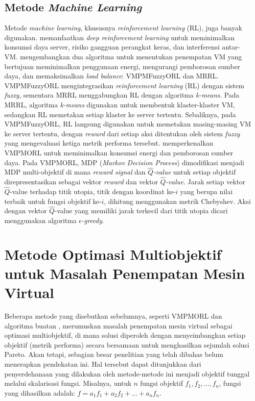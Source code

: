 \subsection{Metode \textit{Machine Learning}}
Metode \textit{machine learning}, khususnya \textit{reinforcement learning} (RL), juga banyak digunakan. \citet{Caviglione2021} memanfaatkan \textit{deep reinforcement learning} untuk meminimalkan konsumsi daya server, risiko gangguan perangkat keras, dan interferensi antar-VM. \citet{GhasemiHaghighatKeshavarzi2024} mengembangkan dua algoritma untuk menentukan penempatan VM yang bertujuan meminimalkan penggunaan energi, mengurangi pemborosan sumber daya, dan memaksimalkan \textit{load balance}: VMPMFuzzyORL dan MRRL. VMPMFuzzyORL mengintegrasikan \textit{reinforcement learning} (RL) dengan sistem \textit{fuzzy}, sementara MRRL menggabungkan RL dengan algoritma \textit{k-means}. Pada MRRL, algoritma \textit{k-means} digunakan untuk membentuk klaster-klaster VM, sedangkan RL memetakan setiap klaster ke server tertentu. Sebaliknya, pada VMPMFuzzyORL, RL langsung digunakan untuk memetakan masing-masing VM ke server tertentu, dengan \textit{reward} dari setiap aksi ditentukan oleh sistem \textit{fuzzy} yang mengevaluasi ketiga metrik performa tersebut. \citet{Qin2020} memperkenalkan VMPMORL untuk meminimalkan konsumsi energi dan pemborosan sumber daya. Pada VMPMORL, MDP (\textit{Markov Decision Process}) dimodifikasi menjadi MDP multi-objektif di mana \textit{reward signal} dan \textit{$\widehat{Q}$-value} untuk setiap objektif direpresentasikan sebagai vektor \textit{reward} dan vektor \textit{$\widehat{Q}$-value}. Jarak setiap vektor $\widehat{Q}$-value terhadap titik utopia, titik dengan koordinat ke-$i$ yang berupa nilai terbaik untuk fungsi objektif ke-$i$, dihitung menggunakan metrik Chebyshev. Aksi dengan vektor $\widehat{Q}$-value yang memiliki jarak terkecil dari titik utopia dicari menggunakan algoritma $\epsilon$-\textit{greedy}. 

\section{Metode Optimasi Multiobjektif untuk Masalah Penempatan Mesin Virtual}
Beberapa metode yang disebutkan sebelumnya, seperti VMPMORL \cite{Qin2020} dan algoritma buatan \citep{Caviglione2021}, merumuskan masalah penempatan mesin virtual sebagai optimasi multiobjektif, di mana solusi diperoleh dengan menyeimbangkan setiap objektif (metrik performa) secara bersamaan untuk menghasilkan sejumlah solusi Pareto. Akan tetapi, sebagian besar penelitian yang telah dibahas belum menerapkan pendekatan ini. Hal tersebut dapat ditunjukkan dari penyerdehanaan yang dilakukan oleh metode-metode ini menjadi objektif tunggal melalui skalarisasi fungsi. Misalnya, untuk $n$ fungsi objektif $f_1, f_2, \dots, f_n$, fungsi yang dihasilkan adalah: $f = a_1f_1 + a_2f_2 + \dots + a_nf_n$.

